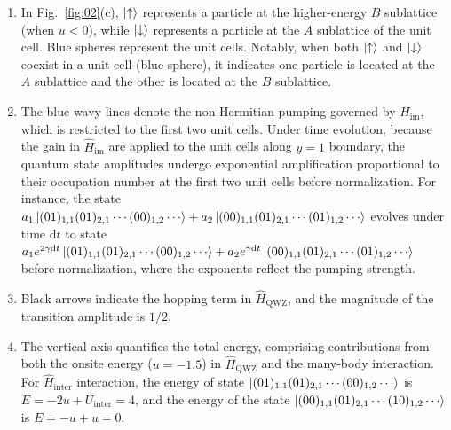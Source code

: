 \documentclass[longbibliography, aps, prx, amsmath, amssymb, amsfonts, twocolumn,superscriptaddress, footinbib]{revtex4-1}
\begin{document}
	\begin{enumerate}
		\item In Fig.~\ref{fig:02}(c), $\ket{\uparrow}$ represents a particle at the higher-energy $B$ sublattice (when $u<0$), while $\ket{\downarrow}$ represents a particle at the $A$ sublattice of the unit cell. 
		Blue spheres represent the unit cells. 
		Notably, when both $\ket{\uparrow}$ and $\ket{\downarrow}$ coexist in a unit cell (blue sphere), it indicates one particle is located at the $A$ sublattice and the other is located at the $B$ sublattice. 
		\item The blue wavy lines denote the non-Hermitian pumping governed by $\hat{H}_{\text{im}}$, which is restricted to the first two unit cells. Under time evolution, because the gain in $\hat{H}_{\text{im}}$ are applied to the unit cells along $y=1$ boundary, the quantum state amplitudes undergo exponential amplification proportional to their occupation number at the first two unit cells before normalization. For instance, the state $a_1 \ket{(01)_{1,1}(01)_{2,1}\cdots(00)_{1,2}\cdots} + a_2\ket{(00)_{1,1}(01)_{2,1}\cdots(01)_{1,2}\cdots}$ evolves under time $\mathrm{d}t$ to state $a_1 e^{2\gamma \mathrm{d}t} \ket{(01)_{1,1}(01)_{2,1}\cdots(00)_{1,2}\cdots} + a_2 e^{\gamma \mathrm{d}t} \ket{(00)_{1,1}(01)_{2,1}\cdots(01)_{1,2}\cdots}$ before normalization, where the exponents reflect the pumping strength. 
		\item Black arrows indicate the hopping term in $\hat{H}_{\text{QWZ}}$, and the magnitude of the transition amplitude is $1/2$. 
		\item The vertical axis quantifies the total energy, comprising contributions from both the onsite energy ($u=-1.5$) in $\hat{H}_{\text{QWZ}}$ and the many-body interaction. For $\hat{H}_{\text{inter}}$ interaction, the energy of state $\ket{(01)_{1,1}(01)_{2,1}\cdots(00)_{1,2}\cdots}$ is $E=-2u+U_{\text{inter}}=4$, and the energy of the state $\ket{(00)_{1,1}(01)_{2,1}\cdots(10)_{1,2}\cdots}$ is $E=-u+u=0$. 
	\end{enumerate}
\end{document}
